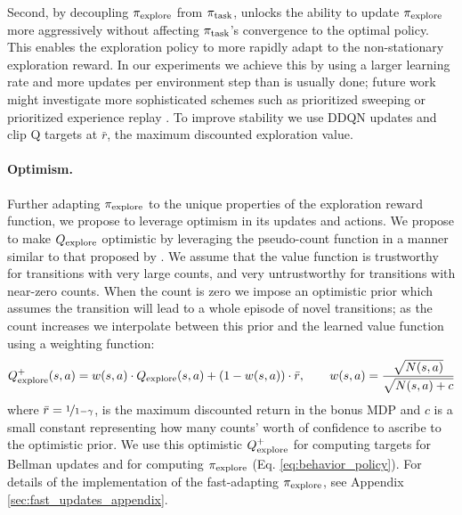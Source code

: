 Second, by decoupling $\pi_{\text{explore}}$ from $\pi_{\text{task}}$, \algshort{} unlocks the ability to update $\pi_{\text{explore}}$ more aggressively without affecting $\pi_{\text{task}}$'s convergence to the optimal policy.
This enables the exploration policy to more rapidly adapt to the non-stationary exploration reward.
In our experiments we achieve this by using a larger learning rate and more updates per environment step than is usually done; future work might investigate more sophisticated schemes such as prioritized sweeping \citep{Moore1993PrioritizedSR} or prioritized experience replay \citep{Schaul2016PrioritizedER}.
To improve stability we use DDQN updates and clip Q targets at $\bar{r}$, the maximum discounted exploration value.

\paragraph{Optimism.} \label{sec:optimistic}
Further adapting $\pi_{\text{explore}}$ to the unique properties of the exploration reward function, we propose to leverage optimism in its updates and actions.
We propose to make $Q_{\text{explore}}$ optimistic by leveraging the pseudo-count function in a manner similar to that proposed by \citet{Rashid2020OptimisticEE}.
We assume that the value function is trustworthy for transitions with very large counts, and very untrustworthy for transitions with near-zero counts.
When the count is zero we impose an optimistic prior which assumes the transition will lead to a whole episode of novel transitions; as the count increases we interpolate between this prior and the learned value function using a weighting function:
\begin{align} \label{eq:optimism}
Q_{\text{explore}}^+(s, a) = w(s, a) \cdot Q_{\text{explore}}(s, a) + (1 - w(s, a))  \cdot \bar{r}, \qquad w(s, a) = \frac{\sqrt{N(s, a)}}{\sqrt{N(s, a) + c}}
\end{align}
where $\bar{r} = \nicefrac{1}{1-\gamma}$, is the maximum discounted return in the bonus MDP and $c$ is a small constant representing how many counts' worth of confidence to ascribe to the optimistic prior.
We use this optimistic $Q_{\text{explore}}^+$ for computing targets for Bellman updates and for computing $\pi_{\text{explore}}$ (Eq. \ref{eq:behavior_policy}).
For details of the implementation of the fast-adapting $\pi_{\text{explore}}$, see Appendix \ref{sec:fast_updates_appendix}.


